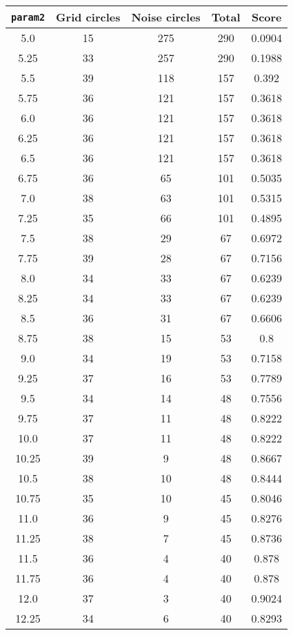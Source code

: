 \documentclass[letterpaper, 12pt]{article}
\begin{document}
\begin{longtable}{|c|c|c|c|c|}
\hline
\textbf{\texttt{param2}} & \textbf{Grid circles} & \textbf{Noise circles} & \textbf{Total} & \textbf{Score} \\
\hline
5.0 & 15 & 275 & 290 & 0.0904 \\
\hline
5.25 & 33 & 257 & 290 & 0.1988 \\
\hline
5.5 & 39 & 118 & 157 & 0.392 \\
\hline
5.75 & 36 & 121 & 157 & 0.3618 \\
\hline
6.0 & 36 & 121 & 157 & 0.3618 \\
\hline
6.25 & 36 & 121 & 157 & 0.3618 \\
\hline
6.5 & 36 & 121 & 157 & 0.3618 \\
\hline
6.75 & 36 & 65 & 101 & 0.5035 \\
\hline
7.0 & 38 & 63 & 101 & 0.5315 \\
\hline
7.25 & 35 & 66 & 101 & 0.4895 \\
\hline
7.5 & 38 & 29 & 67 & 0.6972 \\
\hline
7.75 & 39 & 28 & 67 & 0.7156 \\
\hline
8.0 & 34 & 33 & 67 & 0.6239 \\
\hline
8.25 & 34 & 33 & 67 & 0.6239 \\
\hline
8.5 & 36 & 31 & 67 & 0.6606 \\
\hline
8.75 & 38 & 15 & 53 & 0.8 \\
\hline
9.0 & 34 & 19 & 53 & 0.7158 \\
\hline
9.25 & 37 & 16 & 53 & 0.7789 \\
\hline
9.5 & 34 & 14 & 48 & 0.7556 \\
\hline
9.75 & 37 & 11 & 48 & 0.8222 \\
\hline
10.0 & 37 & 11 & 48 & 0.8222 \\
\hline
10.25 & 39 & 9 & 48 & 0.8667 \\
\hline
10.5 & 38 & 10 & 48 & 0.8444 \\
\hline
10.75 & 35 & 10 & 45 & 0.8046 \\
\hline
11.0 & 36 & 9 & 45 & 0.8276 \\
\hline
11.25 & 38 & 7 & 45 & 0.8736 \\
\hline
11.5 & 36 & 4 & 40 & 0.878 \\
\hline
11.75 & 36 & 4 & 40 & 0.878 \\
\hline
12.0 & 37 & 3 & 40 & 0.9024 \\
\hline
12.25 & 34 & 6 & 40 & 0.8293 \\
\hline

\end{longtable}
\end{document}
